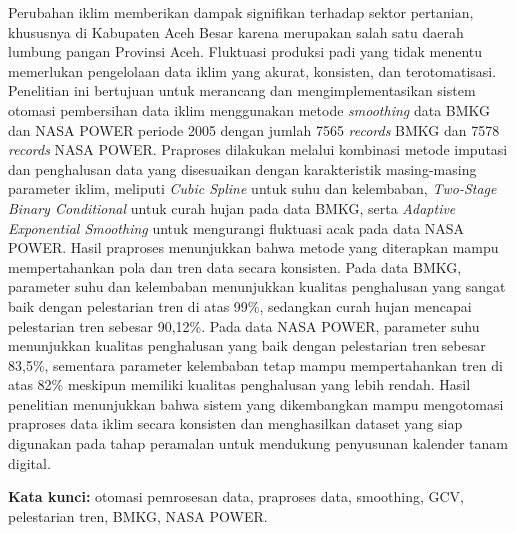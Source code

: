 \renewcommand{\abstractname}{ABSTRAK}
\begin{abstractind}
Perubahan iklim memberikan dampak signifikan terhadap sektor pertanian, khususnya di Kabupaten Aceh Besar karena merupakan salah satu daerah lumbung pangan Provinsi Aceh. Fluktuasi produksi padi yang tidak menentu memerlukan pengelolaan data iklim yang akurat, konsisten, dan terotomatisasi. Penelitian ini bertujuan untuk merancang dan mengimplementasikan sistem otomasi pembersihan data iklim menggunakan metode \textit{smoothing} data BMKG dan NASA POWER periode 2005 dengan jumlah 7565 \textit{records} BMKG dan 7578 \textit{records} NASA POWER. Praproses dilakukan melalui kombinasi metode imputasi dan penghalusan data yang disesuaikan dengan karakteristik masing-masing parameter iklim, meliputi \textit{Cubic Spline} untuk suhu dan kelembaban, \textit{Two-Stage Binary Conditional} untuk curah hujan pada data BMKG, serta \textit{Adaptive Exponential Smoothing} untuk mengurangi fluktuasi acak pada data NASA POWER. Hasil praproses menunjukkan bahwa metode yang diterapkan mampu mempertahankan pola dan tren data secara konsisten. Pada data BMKG, parameter suhu dan kelembaban menunjukkan kualitas penghalusan yang sangat baik dengan pelestarian tren di atas 99\%, sedangkan curah hujan mencapai pelestarian tren sebesar 90,12\%. Pada data NASA POWER, parameter suhu menunjukkan kualitas penghalusan yang baik dengan pelestarian tren sebesar 83,5\%, sementara parameter kelembaban tetap mampu mempertahankan tren di atas 82\% meskipun memiliki kualitas penghalusan yang lebih rendah. Hasil penelitian menunjukkan bahwa sistem yang dikembangkan mampu mengotomasi praproses data iklim secara konsisten dan menghasilkan dataset yang siap digunakan pada tahap peramalan untuk mendukung penyusunan kalender tanam digital.

\bigskip
\noindent
\textbf{Kata kunci:} otomasi pemrosesan data, praproses data, smoothing, GCV, pelestarian tren, BMKG, NASA POWER.
\end{abstractind}

